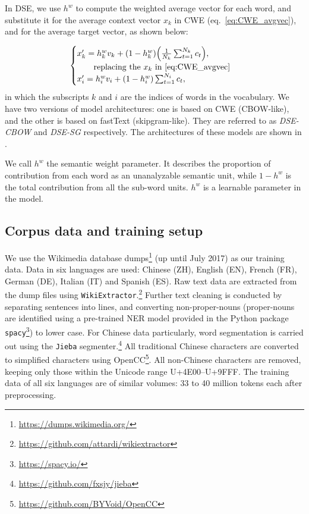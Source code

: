 \documentclass[output=paper]{langsci/langscibook}
\begin{document}
In DSE, we use $h^w$ to compute the weighted average vector for each word, and substitute it for the average context vector $x_k$ in CWE (eq.~\ref{eq:CWE_avgvec}), and for the average target vector, as shown below:

\begin{equation}\label{eq:DSE_avgvec}
\begin{cases}
	x'_{k} = h^w_{k} v_k + (1 - h^w_k)\Big(\frac{1}{N_k}\sum^{N_k}_{t=1}{c_t}\Big), \\
		\quad\quad \text{replacing the } x_k \text{ in \cref{eq:CWE_avgvec}} \\
	x'_i = h^w_{i} v_i + (1 - h^w_i) \sum^{N_i}_{t=1}{c_t}, 
\end{cases}
\end{equation}
\noindent in which the subscripts $k$ and $i$ are the indices of words in the vocabulary. 
We have two versions of model architectures: one is based on CWE (CBOW-like), and the other is based on fastText (skipgram-like). They are referred to as \emph{DSE-CBOW} and \emph{DSE-SG} respectively.
The architectures of these models are shown in .

We call $h^w$ the semantic weight parameter. It describes the proportion of contribution from each word as an unanalyzable semantic unit, while $1-h^w$ is the total contribution from all the sub-word units.
$h^w$ is a learnable parameter in the model.


\subsection{Corpus data and training setup}
We use the Wikimedia database dumps\footnote{\url{https://dumps.wikimedia.org/}} (up until July 2017) as our training data. Data in six languages are used: Chinese (ZH), English (EN), French (FR), German (DE), Italian (IT) and Spanish (ES). Raw text data are extracted from the dump files using \texttt{WikiExtractor}.\footnote{ \url{https://github.com/attardi/wikiextractor}} Further text cleaning is conducted by separating sentences into lines, and converting non-proper-nouns (proper-nouns are identified using a pre-trained NER model provided in the Python package \texttt{spacy}\footnote{\url{https://spacy.io/}}) to lower case. 
For Chinese data particularly, word segmentation is carried out using the \texttt{Jieba} segmenter.\footnote{{\url{https://github.com/fxsjy/jieba}}} All traditional Chinese characters are converted to simplified characters using OpenCC\footnote{{\url{https://github.com/BYVoid/OpenCC}}}. All non-Chinese characters are removed, keeping only those within the Unicode range U+4E00--U+9FFF. 
The training data of all six languages are of similar volumes: 33 to 40 million tokens each after preprocessing. 
\end{document}
